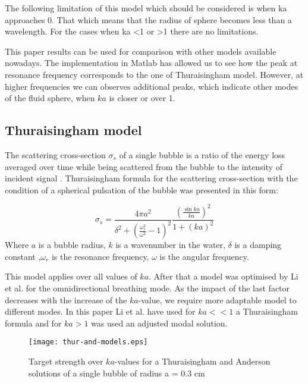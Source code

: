 The following limitation of this model which should be considered is when ka approaches 0. That which means that the radius of sphere becomes less than a wavelength. For the cases when ka <1 or >1 there are no limitations.

This paper results can be used for comparison with other models available nowadays. The implementation in Matlab has allowed us to see how the peak at resonance frequency corresponds to the one of Thuraisingham model. However, at higher frequencies we can observes additional peaks, which indicate other modes of the fluid sphere, when $ka$ is closer or over 1.

\subsection{Thuraisingham model}
The scattering cross-section $\sigma_s$ of a single bubble is a ratio of the energy loss averaged over time while being scattered from the bubble to the intensity of incident signal \cite[p.408]{thuraisingham_new_1997}. Thuraisingham formula for the scattering cross-section with the condition of a spherical pulsation of the bubble was presented in this form: 

\begin{equation}\label{eq:thuraisingham}
    \sigma_s=\frac{4\pi a^2}{\delta^2 + (\frac{\omega_r^2}{\omega^2}-1)^2}\frac{(\frac{\sin ka}{ka})^2}{1+(ka)^2}
\end{equation}
Where $a$ is a bubble radius, $k$ is a wavenumber in the water, $\delta$ is a damping constant ,$\omega_r$  is the resonance frequency, $\omega$  is the angular frequency.

This model applies over all values of $ka$. After that a model was optimised by Li et al. \cite[]{li_broadband_2020} for the omnidirectional breathing mode. As the impact of the last factor decreases with the increase of the $ka$-value, we require more adaptable model to different modes. In this paper Li et al. have used for $ka << 1$ a Thuraisingham formula and for $ka>1$ was used an adjusted modal solution.

\begin{figure}[H]
    \centering
    \texttt{[image: thur-and-models.eps]}
    \caption*{Target strength over $ka$-values for a Thuraisingham and Anderson solutions of a single bubble of radius a = 0.3 cm}
    \label{fig:thur-anderson}
\end{figure}

